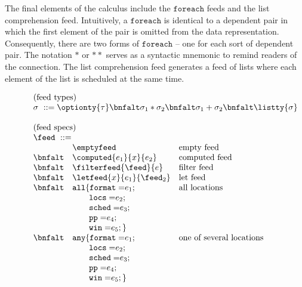 The final elements of the calculus include the $\mathtt{foreach}$ feeds
and the list comprehension feed.
Intuitively, a $\mathtt{foreach}$ is identical to a dependent pair in
which the first element of the pair is omitted from the data representation.
Consequently, there are two forms of $\mathtt{foreach}$ -- one for
each sort of dependent pair.  The notation ${*}$ or ${**}$ serves as
a syntactic mnemonic to remind readers of the connection.  The list comprehension
feed generates a feed of lists where each element of the list is scheduled at the same time.

\begin{figure}[t]
\[
\begin{array}{lll}
\multicolumn{3}{l}{\mbox{(feed types)}}\\ 
\multicolumn{3}{l}{\sigma \ ::= \optionty{\tau} 
  \bnfalt \sigma_1 * \sigma_2
  \bnfalt \sigma_1 + \sigma_2
  \bnfalt \listty{\sigma}
}   \\  
\\
\multicolumn{3}{l}{\mbox{(feed specs)}}\\ 
\multicolumn{3}{l}{\feed \ ::=}   \\  
& \emptyfeed & \mbox{empty feed} \\
 \bnfalt & \computed{e_1}{x}{e_2} & \mbox{computed feed} \\
 \bnfalt & \filterfeed{\feed}{e} & \mbox{filter feed} \\
 \bnfalt & \letfeed{x}{e_1}{\feed_2} & \mbox{let feed} \\
 \bnfalt &     \mathtt{all \{ format=} e_1; & \mbox{all locations}\\ 
& \qquad     \mathtt{locs=} e_2; & \\
& \qquad     \mathtt{sched=} e_3; & \\
& \qquad     \mathtt{pp=} e_4; & \\
& \qquad     \mathtt{win=} e_5; \}  & \\
 \bnfalt &     \mathtt{any \{ format=} e_1; & \mbox{one of several locations}\\ 
& \qquad     \mathtt{locs=} e_2; & \\
& \qquad     \mathtt{sched=} e_3; & \\
& \qquad     \mathtt{pp=} e_4; & \\
& \qquad     \mathtt{win=} e_5; \}  & \\

\end{array}\]
\end{figure}
